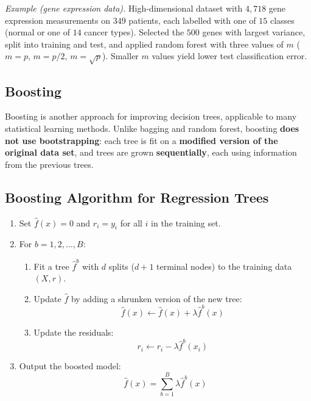 \documentclass[11pt,a4paper]{article}
\theoremstyle{definition}
\theoremstyle{plain}
\theoremstyle{remark}
\begin{document}
\textit{Example (gene expression data).} High-dimensional dataset with $4{,}718$ gene expression measurements on $349$ patients, each labelled with one of $15$ classes (normal or one of $14$ cancer types). Selected the $500$ genes with largest variance, split into training and test, and applied random forest with three values of $m$ ($m = p$, $m = p/2$, $m = \sqrt{p}$). Smaller $m$ values yield lower test classification error.

\subsection{Boosting}

\begin{tcolorbox}[colback=blue!5!white,colframe=blue!75!black,title=\textbf{Boosting}]
Boosting is another approach for improving decision trees, applicable to many statistical learning methods. Unlike bagging and random forest, boosting \textbf{does not use bootstrapping}: each tree is fit on a \textbf{modified version of the original data set}, and trees are grown \textbf{sequentially}, each using information from the previous trees.
\end{tcolorbox}

\subsection{Boosting Algorithm for Regression Trees}

\begin{tcolorbox}[colback=green!5!white,colframe=green!75!black,title=\textbf{Boosting for Regression Trees}]
\begin{enumerate}
    \item Set $\hat{f}(x) = 0$ and $r_i = y_i$ for all $i$ in the training set.
    \item For $b = 1, 2, \ldots, B$:
    \begin{enumerate}
        \item Fit a tree $\hat{f}^b$ with $d$ splits ($d + 1$ terminal nodes) to the training data $(X, r)$.
        \item Update $\hat{f}$ by adding a shrunken version of the new tree:
        \[
            \hat{f}(x) \leftarrow \hat{f}(x) + \lambda \hat{f}^b(x)
        \]
        \item Update the residuals:
        \[
            r_i \leftarrow r_i - \lambda \hat{f}^b(x_i)
        \]
    \end{enumerate}
    \item Output the boosted model:
    \[
        \hat{f}(x) = \sum_{b=1}^{B} \lambda \hat{f}^b(x)
    \]
\end{enumerate}
\end{tcolorbox}
\end{document}
